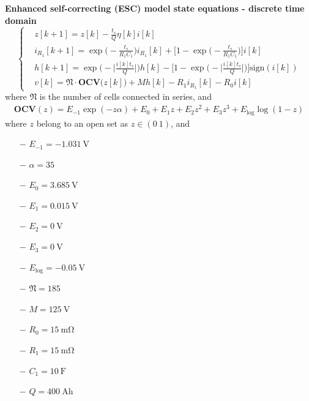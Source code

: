 \documentclass[11pt,a4paper,oneside]{book}
\numberwithin{equation}{section}
\newcommand{\abs}[1]{\big|#1\big|}
\newcommand{\sign}{\text{sign}}
\theoremstyle{it}
\theoremstyle{definition}
\begin{document}
\begin{mybox}
	\textbf{Enhanced self-correcting (ESC) model state equations - discrete time 
		domain}
	\begin{equation}\label{lithium_ion_battery_ctrl_problem_eq_3}
		\left\lbrace \begin{aligned}
			&	z[k+1] =z[k] -\frac{t_s}{Q}\eta[k]i[k] \\[6pt]
			&	i_{R_1}[k+1] = \exp\Big(-\frac{t_s}{R_1C_1}\Big)i_{R_1}[k]+\Big[1-\exp\Big(-\frac{t_s}{R_1C_1}\Big)\Big]i[k] \\[6pt]
			&	h[k+1] = \exp\Bigg(-\abs{\frac{i[k] t_s}{Q}}\Bigg)h[k] - \Bigg[1-\exp\Bigg(-\abs{\frac{i[k] t_s}{Q}}\Bigg)\Bigg]\sign(i[k]) \\[6pt]
			&	v[k] = \mathfrak{N}\cdot\mathbf{OCV}\Big(z[k]\Big) +Mh[k]-R_1i_{R_1}[k] - R_0i[k]
		\end{aligned}\right. 
	\end{equation}
	where $\mathfrak{N}$ is the number of cells connected in series, and
	\begin{equation}\label{lithium_ion_battery_ctrl_problem_eq_4}
		\begin{aligned}
			\mathbf{OCV}(z) = E_{-1}\exp(-z\alpha) + E_0 + E_1z + E_2z^2 + E_3z^3 +  E_\text{log}\log({1-z})
		\end{aligned}
	\end{equation}
	where $z$ belong to an open set as $z\in\left(0\ 1\right)$, and
	\begin{multicols}{3}
		\begin{itemize}
			\item[$-$] $E_{-1}=\SI{-1.031}{\volt}$
			\item[$-$] $\alpha=\SI{35}{}$
			\item[$-$] $E_0=\SI{3.685}{\volt}$
			\item[$-$] $E_1=\SI{0.015}{\volt}$
			\item[$-$] $E_2=\SI{0}{\volt}$
			\item[$-$] $E_3=\SI{0}{\volt}$
			\item[$-$] $E_\text{log}=\SI{-0.05}{\volt}$	
			\item[$-$] $\mathfrak{N}=185$
			\item[$-$] $M=\SI{125}{\volt}$
			\item[$-$] $R_0=\SI{15}{\milli\ohm}$
			\item[$-$] $R_1=\SI{15}{\milli\ohm}$
			\item[$-$] $C_1=\SI{10}{\farad}$
			\item[$-$] $Q=\SI{400}{\ampere\hour}$
		\end{itemize}

\end{multicols}
\end{mybox}
\end{document}
